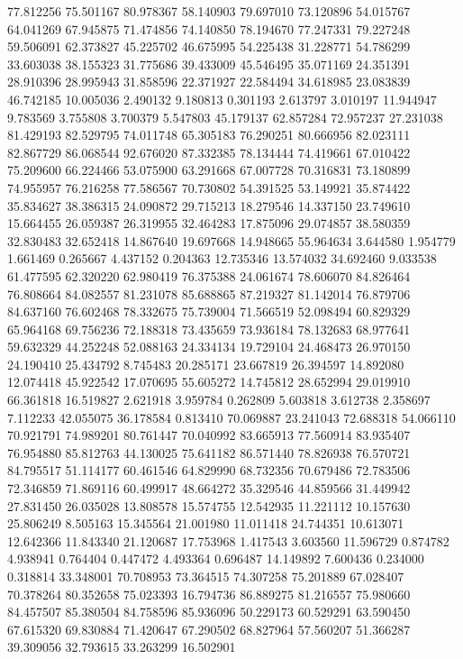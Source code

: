 77.812256
75.501167
80.978367
58.140903
79.697010
73.120896
54.015767
64.041269
67.945875
71.474856
74.140850
78.194670
77.247331
79.227248
59.506091
62.373827
45.225702
46.675995
54.225438
31.228771
54.786299
33.603038
38.155323
31.775686
39.433009
45.546495
35.071169
24.351391
28.910396
28.995943
31.858596
22.371927
22.584494
34.618985
23.083839
46.742185
10.005036
2.490132
9.180813
0.301193
2.613797
3.010197
11.944947
9.783569
3.755808
3.700379
5.547803
45.179137
62.857284
72.957237
27.231038
81.429193
82.529795
74.011748
65.305183
76.290251
80.666956
82.023111
82.867729
86.068544
92.676020
87.332385
78.134444
74.419661
67.010422
75.209600
66.224466
53.075900
63.291668
67.007728
70.316831
73.180899
74.955957
76.216258
77.586567
70.730802
54.391525
53.149921
35.874422
35.834627
38.386315
24.090872
29.715213
18.279546
14.337150
23.749610
15.664455
26.059387
26.319955
32.464283
17.875096
29.074857
38.580359
32.830483
32.652418
14.867640
19.697668
14.948665
55.964634
3.644580
1.954779
1.661469
0.265667
4.437152
0.204363
12.735346
13.574032
34.692460
9.033538
61.477595
62.320220
62.980419
76.375388
24.061674
78.606070
84.826464
76.808664
84.082557
81.231078
85.688865
87.219327
81.142014
76.879706
84.637160
76.602468
78.332675
75.739004
71.566519
52.098494
60.829329
65.964168
69.756236
72.188318
73.435659
73.936184
78.132683
68.977641
59.632329
44.252248
52.088163
24.334134
19.729104
24.468473
26.970150
24.190410
25.434792
8.745483
20.285171
23.667819
26.394597
14.892080
12.074418
45.922542
17.070695
55.605272
14.745812
28.652994
29.019910
66.361818
16.519827
2.621918
3.959784
0.262809
5.603818
3.612738
2.358697
7.112233
42.055075
36.178584
0.813410
70.069887
23.241043
72.688318
54.066110
70.921791
74.989201
80.761447
70.040992
83.665913
77.560914
83.935407
76.954880
85.812763
44.130025
75.641182
86.571440
78.826938
76.570721
84.795517
51.114177
60.461546
64.829990
68.732356
70.679486
72.783506
72.346859
71.869116
60.499917
48.664272
35.329546
44.859566
31.449942
27.831450
26.035028
13.808578
15.574755
12.542935
11.221112
10.157630
25.806249
8.505163
15.345564
21.001980
11.011418
24.744351
10.613071
12.642366
11.843340
21.120687
17.753968
1.417543
3.603560
11.596729
0.874782
4.938941
0.764404
0.447472
4.493364
0.696487
14.149892
7.600436
0.234000
0.318814
33.348001
70.708953
73.364515
74.307258
75.201889
67.028407
70.378264
80.352658
75.023393
16.794736
86.889275
81.216557
75.980660
84.457507
85.380504
84.758596
85.936096
50.229173
60.529291
63.590450
67.615320
69.830884
71.420647
67.290502
68.827964
57.560207
51.366287
39.309056
32.793615
33.263299
16.502901
